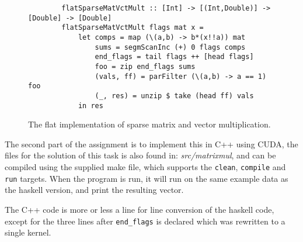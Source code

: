 \begin{figure}[H]
    \begin{lstlisting}
        flatSparseMatVctMult :: [Int] -> [(Int,Double)] -> [Double] -> [Double]
        flatSparseMatVctMult flags mat x =
            let comps = map (\(a,b) -> b*(x!!a)) mat
                sums = segmScanInc (+) 0 flags comps
                end_flags = tail flags ++ [head flags]
                foo = zip end_flags sums
                (vals, ff) = parFilter (\(a,b) -> a == 1) foo
                (_, res) = unzip $ take (head ff) vals
            in res
    \end{lstlisting}
    \caption{The flat implementation of sparse matrix and vector
    multiplication.}
    \label{fig:t1c2code}
\end{figure}

The second part of the assignment is to implement this in C++ using CUDA, the files
for the solution of this task is also found in: \textit{src/matrixmul}, and can
be compiled using the supplied make file, which supports the \texttt{clean},
\texttt{compile} and \texttt{run} targets. When the program is run, it will run
on the same example data as the haskell version, and print the resulting vector.

The C++ code is more or less a line for line conversion of the haskell code,
except for the three lines after \texttt{end\_flags} is declared which was
rewritten to a single kernel.
